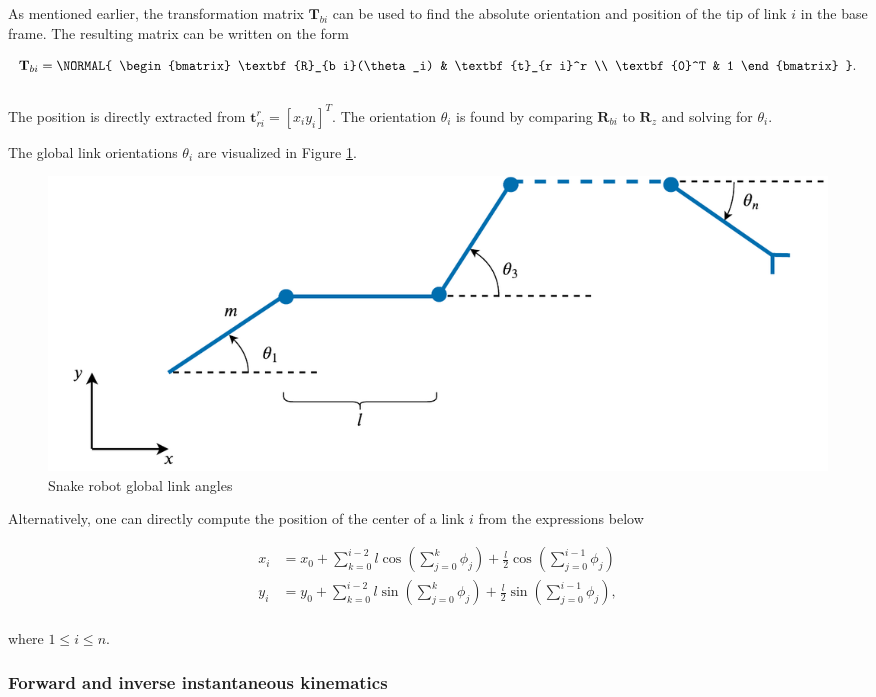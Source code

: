 As mentioned earlier, the transformation matrix $\textbf{T}_{b i}$ can be used to find the absolute orientation and position of the tip of link $i$ in the base frame.
The resulting matrix can be written on the form

\begin{equation}
    \textbf{T}_{b i} =
    \NORMAL{
    \begin{bmatrix}
        \textbf{R}_{b i}(\theta_i) & \textbf{t}_{r i}^r \\
        \textbf{0}^T & 1
    \end{bmatrix} }.
\end{equation}
\\
The position is directly extracted from $\textbf{t}_{r i}^r = [x_i y_i]^T$. The orientation $\theta_i$ is found by comparing $\textbf{R}_{b i}$ to $\textbf{R}_z$ and solving for $\theta_i$.

The global link orientations $\theta_i$ are visualized in Figure \ref{fig:theta}.
\begin{figure}
    \centering
    \includegraphics[width=\textwidth]{figures/theory/extra-coords-no-obst.pdf}
    \caption{Snake robot global link angles}
    \label{fig:theta}
\end{figure}

Alternatively, one can directly compute the position of the center of a link $i$ from the expressions below

\begin{equation} \label{eq:pos}
    \begin{split}
        x_i &= x_0 + \sum_{k=0}^{i-2} l \cos{(\sum_{j=0}^{k} \phi_j)} + \frac{l}{2} \cos{(\sum_{j=0}^{i-1} \phi_j)} \\
        y_i &= y_0 + \sum_{k=0}^{i-2} l \sin{(\sum_{j=0}^{k} \phi_j)} + \frac{l}{2} \sin{(\sum_{j=0}^{i-1} \phi_j)},
    \end{split}
\end{equation}
\\
where $1\leq i\leq n$.

\subsubsection{Forward and inverse instantaneous kinematics}\label{subseq:inst_fwd}

